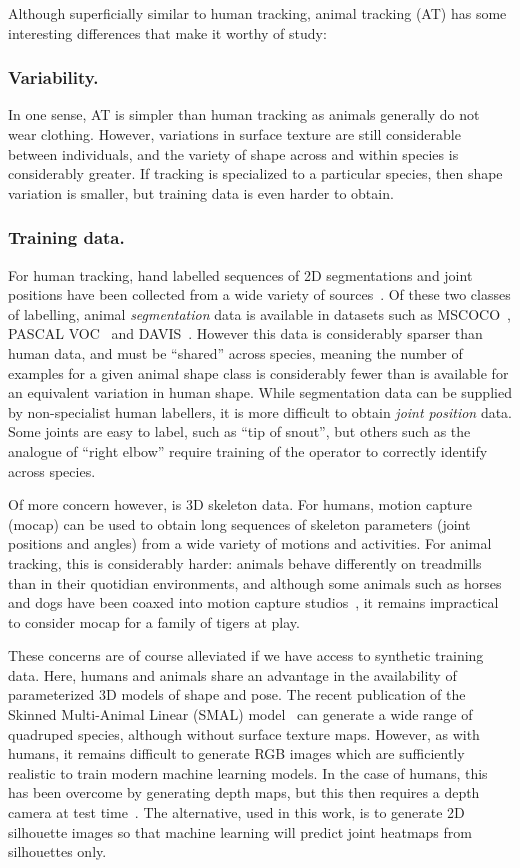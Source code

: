 Although superficially similar to human tracking, animal tracking (AT) has some interesting differences that make it worthy of study:

\subsubsection*{Variability.}
In one sense, AT is simpler than human tracking as animals generally do not wear clothing. However, variations in surface texture are still considerable between individuals, and the variety of shape across and within species is considerably greater.  If tracking is specialized to a particular species, then shape variation is smaller, but training data is even harder to obtain.

\subsubsection*{Training data.}
For human tracking, hand labelled sequences of 2D segmentations and joint positions have been collected from a wide variety of sources~\cite{andriluka14cvpr,mscoco,johnson2010clustered}. Of these two classes of labelling, animal {\em segmentation} data is available in datasets such as MSCOCO~\cite{mscoco}, PASCAL VOC~\cite{pascal-voc-2012} and DAVIS~\cite{Perazzi2016}.  However this data is considerably sparser than human data, and must be ``shared'' across species, meaning the number of examples for a given animal shape class is considerably fewer than is available for an equivalent variation in human shape.  While segmentation data can be supplied by non-specialist human labellers, it is more difficult to obtain {\em joint position} data.  Some joints are easy to label, such as ``tip of snout'', but others such as the analogue of ``right elbow'' require training of the operator to correctly identify across species.

Of more concern however, is 3D skeleton data.  For humans, motion capture (mocap) can be used to obtain long sequences of skeleton parameters (joint positions and angles) from a wide variety of motions and activities.
For animal tracking, this is considerably harder: animals behave differently on treadmills than in their quotidian environments, and although some animals such as horses and dogs have been coaxed into motion capture studios~\cite{wilhelm2015furyexplorer}, it remains impractical to consider mocap for a family of tigers at play.

These concerns are of course alleviated if we have access to synthetic training data.  Here, humans and animals share an advantage in the availability of parameterized 3D models of shape and pose.  The recent publication of the Skinned Multi-Animal Linear (SMAL) model~\cite{zuffi2017menagerie} can generate a wide range of quadruped species, although without surface texture maps.  However, as with humans, it remains difficult to generate RGB images which are sufficiently realistic to train modern machine learning models.  In the case of humans, this has been overcome by generating depth maps, but this then requires a depth camera at test time~\cite{shotton-kinect}. The alternative, used in this work, is to generate 2D silhouette images so that machine learning will predict joint heatmaps from silhouettes only.

